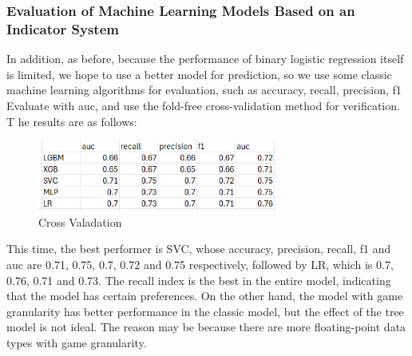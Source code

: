 \documentclass{article}
\begin{document}
\subsubsection{Evaluation of Machine Learning Models Based on an Indicator System}
In addition, as before, because the performance of binary logistic regression itself is limited, we hope to use a better model for prediction,
so we use some classic machine learning algorithms for evaluation, such as accuracy, recall, precision, f1 Evaluate with auc, and use the fold-free cross-validation method for verification. T he results are as follows:
\begin{figure}[H]
      \centering
      \includegraphics[width=0.7\textwidth]{crossValidation2.png}
      \caption{Cross Valadation}
\end{figure}

This time, the best performer is SVC, whose accuracy, precision, recall, f1 and auc are 0.71, 0.75, 0.7, 0.72 and 0.75 respectively,
followed by LR, which is 0.7, 0.76, 0.71 and 0.73. The recall index is the best in the entire model, indicating that the model has certain preferences. On the other hand, the model
with game granularity has better performance in the classic model, but the effect of the tree model is not ideal. The reason may be because there are more floating-point data types with game granularity.
\end{document}
